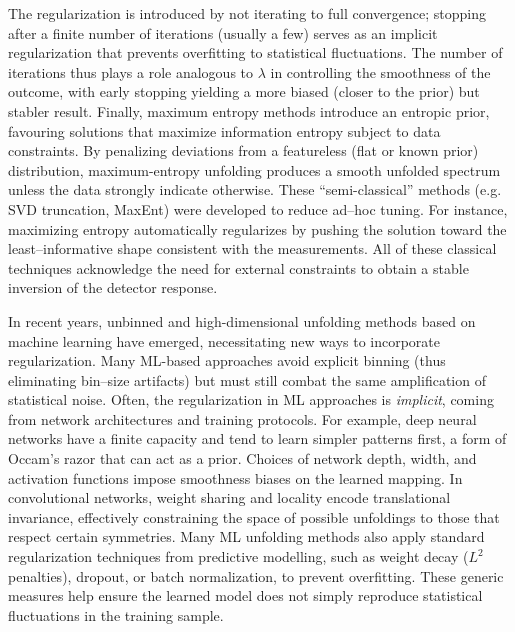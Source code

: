         The regularization is introduced by not iterating to full convergence; stopping after a finite number of iterations (usually a few) serves as an implicit regularization that prevents overfitting to statistical fluctuations.\kd{}
        The number of iterations thus plays a role analogous to $\lambda$ in controlling the smoothness of the outcome, with early stopping yielding a more biased (closer to the prior) but stabler result.\kd{}
        Finally, {maximum entropy} methods introduce an entropic prior, favouring solutions that maximize information entropy subject to data constraints. 
        By penalizing deviations from a featureless (flat or known prior) distribution, maximum-entropy unfolding produces a smooth unfolded spectrum unless the data strongly indicate otherwise.
        These “semi-classical” methods (e.g. SVD truncation, MaxEnt) were developed to reduce ad--hoc tuning.
        For instance, maximizing entropy automatically regularizes by pushing the solution toward the least--informative shape consistent with the measurements.
        All of these classical techniques acknowledge the need for external constraints to obtain a stable inversion of the detector response.

        In recent years, unbinned and high-dimensional unfolding methods based on machine learning have emerged, necessitating new ways to incorporate regularization.\kd{}
        Many ML-based approaches avoid explicit binning (thus eliminating bin--size artifacts) but must still combat the same amplification of statistical noise.
        Often, the regularization in ML approaches is \emph{implicit}, coming from network architectures and training protocols.\kd{}
        For example, deep neural networks have a finite capacity and tend to learn simpler patterns first, a form of Occam’s razor that can act as a prior.
        Choices of network depth, width, and activation functions impose smoothness biases on the learned mapping.\kd{}
        In convolutional networks, weight sharing and locality encode translational invariance, effectively constraining the space of possible unfoldings to those that respect certain symmetries.\kd{}
        Many ML unfolding methods also apply standard regularization techniques from predictive modelling, such as weight decay ($L^2$ penalties), dropout, or batch normalization, to prevent overfitting.
        These generic measures help ensure the learned model does not simply reproduce statistical fluctuations in the training sample.

